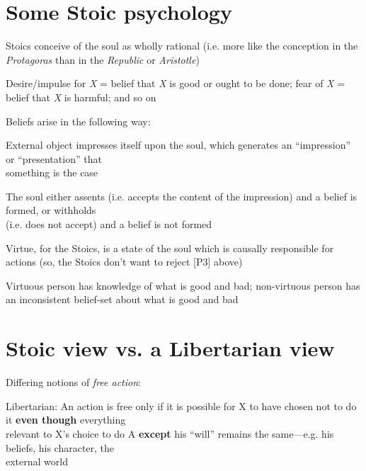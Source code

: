 \documentclass[11pt]{article}
\begin{document}
\section*{Some Stoic psychology}

\noindent Stoics conceive of the soul as wholly rational (i.e. more like the conception in the \emph{Protagoras} than in the \emph{Republic} or \emph{Aristotle})
\vspace*{2mm}

\noindent Desire/impulse for \emph{X} = belief that \emph{X} is good or ought to be done; fear of \emph{X} = belief that \emph{X} is harmful; and so on
\vspace*{2mm}

\noindent Beliefs arise in the following way: 
\vspace*{2mm}

External object impresses itself upon the soul, which generates an ``impression'' or ``presentation'' that\\\hspace*{6mm}something is the case
\vspace*{1mm}

The soul either assents (i.e. accepts the content of the impression) and a belief is formed, or withholds\\\hspace*{6mm}(i.e. does not accept) and a belief is not formed
\vspace*{2mm}

\noindent Virtue, for the Stoics, is a state of the soul which is causally responsible for actions (so, the Stoics don't want to reject [P3] above)
\vspace*{2mm}

\noindent Virtuous person has knowledge of what is good and bad; non-virtuous person has an inconsistent belief-set about what is good and bad
\vspace{-3mm}

\section*{Stoic view vs. a Libertarian view}

\noindent Differing notions of \emph{free action}:

Libertarian: An action is free only if it is possible for X to have chosen not to do it \textbf{even though} everything\\\hspace*{6mm}relevant to X's choice to do A \textbf{except} his ``will'' remains the same---e.g. his beliefs, his character, the\\\hspace*{6mm}external world
\vspace*{2mm}
\end{document}
